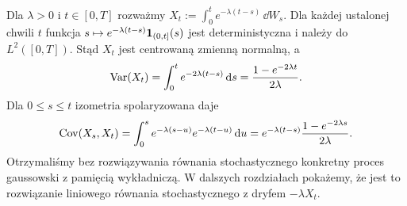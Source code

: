 \begin{przyklad}
Dla $\lambda>0$ i $t\in[0,T]$ rozważmy
$X_t:=\int_0^te^{-\lambda(t-s)}\,\dd W_s$.
Dla każdej ustalonej chwili $t$ funkcja
$s\mapsto e^{-\lambda(t-s)}\mathbf{1}_{(0,t]}(s)$
jest deterministyczna i należy do $L^2([0,T])$.
Stąd $X_t$ jest centrowaną zmienną normalną, a
\[
\operatorname{Var}(X_t)=\int_0^te^{-2\lambda(t-s)}\,\mathrm{d} s
=\frac{1-e^{-2\lambda t}}{2\lambda}.
\]
Dla $0\le s\le t$ izometria spolaryzowana daje
\[
\operatorname{Cov}(X_s,X_t)
=\int_0^s e^{-\lambda(s-u)}e^{-\lambda(t-u)}\,\mathrm{d} u
=e^{-\lambda(t-s)}\frac{1-e^{-2\lambda s}}{2\lambda}.
\]
Otrzymaliśmy bez rozwiązywania równania stochastycznego
konkretny proces gaussowski z pamięcią wykładniczą.
W dalszych rozdziałach pokażemy, że jest to rozwiązanie
liniowego równania stochastycznego z dryfem
$-\lambda X_t$.
\end{przyklad}


